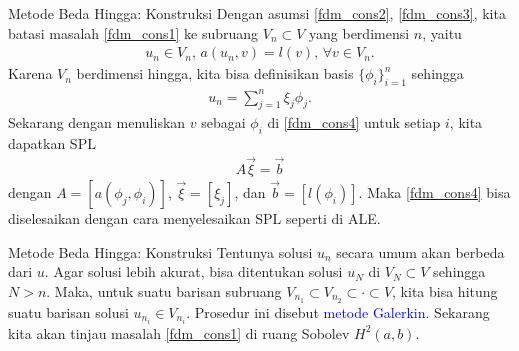 \documentclass[xcolor={dvipsnames}, 9pt]{beamer}
\renewcommand{\emph}[1]{\textcolor{Blue}{#1}}
\begin{document}
	\begin{frame}{Metode Beda Hingga: Konstruksi}
		Dengan asumsi \eqref{fdm_cons2}, \eqref{fdm_cons3}, kita batasi masalah \eqref{fdm_cons1} ke subruang $V_n\subset V$ yang berdimensi $n$, yaitu
		\begin{align}\label{fdm_cons4}
			u_n\in V_n, \, a(u_n, v) = l(v), \, \forall v\in V_n.
		\end{align}
		Karena $V_n$ berdimensi hingga, kita bisa definisikan basis $\{\phi_i\}_{i=1}^n$ sehingga
		\begin{align*}
			u_n = \sum_{j=1}^{n} \xi_j\phi_j.
		\end{align*}
		Sekarang dengan menuliskan $v$ sebagai $\phi_i$ di \eqref{fdm_cons4} untuk setiap $i$, kita dapatkan SPL
		\begin{align}
			A\vec{\xi} = \vec{b}
		\end{align}
		dengan $A = [a(\phi_j,\phi_i)]$, $\vec{\xi} = [\xi_j]$, dan $\vec{b} = [l(\phi_i)]$. Maka \eqref{fdm_cons4} bisa diselesaikan dengan cara menyelesaikan SPL seperti di ALE.
	\end{frame}
	\begin{frame}{Metode Beda Hingga: Konstruksi}
		Tentunya solusi $u_n$ secara umum akan berbeda dari $u$. Agar solusi lebih akurat, bisa ditentukan solusi $u_N$ di $V_N\subset V$ sehingga $N>n$. Maka, untuk suatu barisan subruang $V_{n_1} \subset V_{n_2} \subset \cdot \subset V$, kita bisa hitung suatu barisan solusi $u_{n_i}\in V_{n_i}$. Prosedur ini disebut \emph{metode Galerkin}. \newline
		Sekarang kita akan tinjau masalah \eqref{fdm_cons1} di ruang Sobolev $H^2(a,b)$.
	\end{frame}
\end{document}
